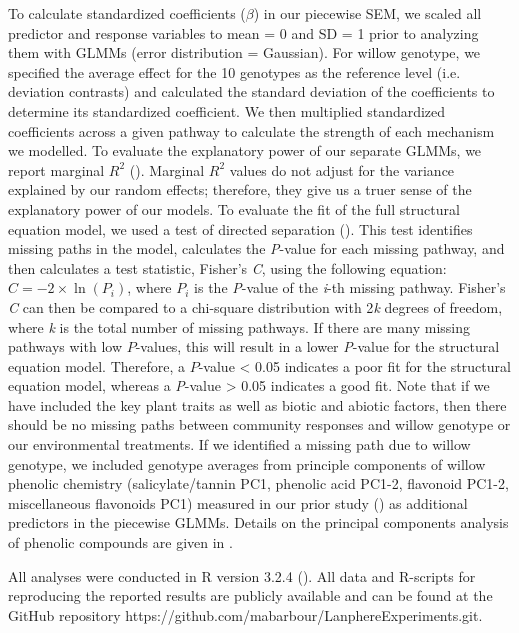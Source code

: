 \documentclass[11pt]{article}
\begin{document}
To calculate standardized coefficients ($\beta$) in our piecewise SEM, we scaled
all predictor and response variables to mean = 0 and SD = 1 prior to
analyzing them with GLMMs (error distribution = Gaussian). For willow
genotype, we specified the average effect for the 10 genotypes as the
reference level (i.e. deviation contrasts) and calculated the standard
deviation of the coefficients to determine its standardized coefficient.
We then multiplied standardized coefficients across a given pathway to
calculate the strength of each mechanism we modelled. To evaluate the
explanatory power of our separate GLMMs, we report marginal
\(R^2\) (\citealt{Nakagawa_2012}). Marginal \(R^2\) values do
not adjust for the variance explained by our random effects; therefore,
they give us a truer sense of the explanatory power of our models. To
evaluate the fit of the full structural equation model, we used a test
of directed separation (\citealt{shipley2000new}). This test identifies missing
paths in the model, calculates the \emph{P}-value for each missing
pathway, and then calculates a test statistic, Fisher's \emph{C}, using
the following equation: \(C=-2\times\ln\left(P_i\right)\), where \(P_i\) is the
\emph{P}-value of the \emph{i}-th missing pathway. Fisher's \emph{C} can
then be compared to a chi-square distribution with 2\emph{k} degrees of
freedom, where \emph{k} is the total number of missing pathways. If
there are many missing pathways with low $P$-values, this will result in a
lower \emph{P}-value for the structural equation model. Therefore, a
$P$-value \textless{} 0.05 indicates a poor fit for the structural
equation model, whereas a \emph{P}-value \textgreater{} 0.05 indicates a
good fit. Note that if we have included the key plant traits as well as
biotic and abiotic factors, then there should be no missing paths between community responses and willow genotype or our environmental treatments. If we identified a missing path due to willow genotype, we included genotype averages from principle components of willow phenolic chemistry (salicylate/tannin PC1, phenolic acid PC1-2, flavonoid PC1-2, miscellaneous flavonoids PC1) measured in our prior study (\citealt{Barbour_2015}) as additional predictors in the piecewise GLMMs. Details on the principal components analysis of phenolic compounds are given in \cite{Barbour_2015}. 

All analyses were conducted in R version 3.2.4 (\citealt{R2016}). All data and R-scripts for reproducing the reported results are publicly available and can be found at the GitHub repository 
https://github.com/mabarbour/Lanphere\textunderscore Experiments.git. 
 
\end{document}
